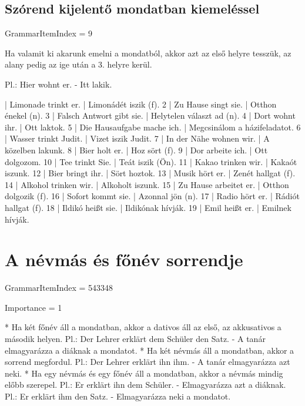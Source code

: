 \documentclass{article}
\newenvironment{desc}{\verbatim}{\endverbatim}
\newenvironment{exmp}{\verbatim}{\endverbatim}
\begin{document}
\subsection{Szórend kijelentő mondatban kiemeléssel}

GrammarItemIndex = 9

\begin{desc}
Ha valamit ki akarunk emelni a mondatból, akkor azt az első helyre tesszük, az alany pedig az ige után a 3. helyre kerül.

Pl.: Hier wohnt er. - Itt lakik.
\end{desc}

\begin{exmp}
1 | Limonade trinkt er. | Limonádét iszik (f).
2 | Zu Hause singt sie. | Otthon énekel (n).
3 | Falsch Antwort gibt sie. | Helytelen választ ad (n).
4 | Dort wohnt ihr. | Ott laktok.
5 | Die Hausaufgabe mache ich. | Megcsinálom a házifeladatot.
6 | Wasser trinkt Judit. | Vizet iszik Judit.
7 | In der Nähe wohnen wir. | A közelben lakunk.
8 | Bier holt er. | Hoz sört (f).
9 | Dor arbeite ich. | Ott dolgozom.
10 | Tee trinkt Sie. | Teát iszik (Ön).
11 | Kakao trinken wir. | Kakaót iszunk.
12 | Bier bringt ihr. | Sört hoztok.
13 | Musik hört er. | Zenét hallgat (f).
14 | Alkohol trinken wir. | Alkoholt iszunk.
15 | Zu Hause arbeitet er. | Otthon dolgozik (f).
16 | Sofort kommt sie. | Azonnal jön (n).
17 | Radio hört er. | Rádiót hallgat (f).
18 | Ildikó heißt sie. | Ildikónak hívják.
19 | Emil heißt er. | Emilnek hívják.
\end{exmp}

\section{A névmás és főnév sorrendje}

GrammarItemIndex = 543348

Importance = 1

\begin{desc}
* Ha két főnév áll a mondatban, akkor a dativos áll az első, az akkusativos a második helyen.
  Pl.: Der Lehrer erklärt dem Schüler den Satz. - A tanár elmagyarázza a diáknak a mondatot.
* Ha két névmás áll a mondatban, akkor a sorrend megfordul.
  Pl.: Der Lehrer erklärt ihn ihm. - A tanár elmagyarázza azt neki.
* Ha egy névmás és egy főnév áll a mondatban, akkor a névmás mindig előbb szerepel.
  Pl.: Er erklärt ihn dem Schüler. - Elmagyarázza azt a diáknak.
  Pl.: Er erklärt ihm den Satz. - Elmagyarázza neki a mondatot.
\end{desc}
\end{document}
